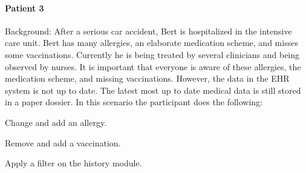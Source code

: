     \paragraph{Patient 3} Background: After a serious car accident, Bert is hospitalized in the intensive care unit. Bert has many allergies, an elaborate medication scheme, and misses some vaccinations. Currently he is being treated by several clinicians and being observed by nurses. It is important that everyone is aware of these allergies, the medication scheme, and missing vaccinations. However, the data in the EHR system is not up to date. The latest most up to date medical data is still stored in a paper dossier. In this scenario the participant does the following:
    \vspace{-16pt}
    \begin{myenumerate}
        \item Change and add an allergy.
        \item Remove and add a vaccination.
        \item Apply a filter on the history module.
    \end{myenumerate}